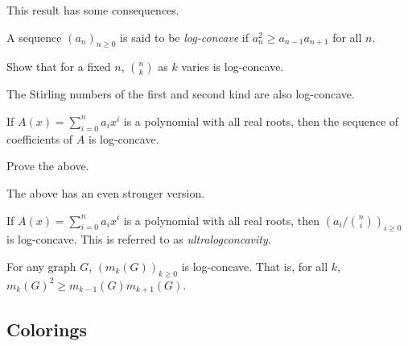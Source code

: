 	
	This result has some consequences.

	\begin{fdef}
		A sequence $(a_n)_{n\ge0}$ is said to be \emph{log-concave} if $a_n^2 \ge a_{n-1} a_{n+1}$ for all $n$.
	\end{fdef}


	\begin{exercise}
		Show that for a fixed $n$, $\binom{n}{k}$ as $k$ varies is log-concave.
	\end{exercise}

	The Stirling numbers of the first and second kind are also log-concave.

	\begin{fprop}
		If $A(x) = \sum_{i=0}^n a_i x^i$ is a polynomial with all real roots, then the sequence of coefficients of $A$ is log-concave.
	\end{fprop}

	\begin{exercise}
		Prove the above.
	\end{exercise}

	The above has an even stronger version.

	\begin{fprop}
		If $A(x) = \sum_{i=0}^n a_i x^i$ is a polynomial with all real roots, then $\left(a_i/\binom{n}{i}\right)_{i \ge 0}$ is log-concave. This is referred to as \emph{ultralogconcavity}.
	\end{fprop}

	\begin{fcor}
		For any graph $G$, $(m_k(G))_{k\ge 0}$ is log-concave. That is, for all $k$, $m_k(G)^2 \ge m_{k-1}(G)m_{k+1}(G)$.
	\end{fcor}





\subsection{Colorings}

